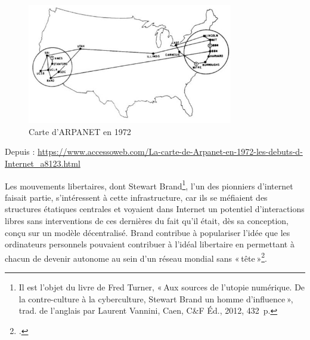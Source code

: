 \begin{figure}[h!]
	\centering
	\includegraphics[width=0.8\textwidth]{images/image24.jpg}
	\caption{Carte d’ARPANET en 1972}
	\label{fig:image24}
\end{figure}

\begin{center}
	Depuis : \url{https://www.accessoweb.com/La-carte-de-Arpanet-en-1972-les-debuts-d-Internet_a8123.html}
\end{center}


Les mouvements libertaires, dont Stewart Brand\footnote{ Il est l’objet du livre de Fred Turner, « Aux sources de l’utopie numérique. De la contre-culture à la cyberculture, Stewart Brand un homme d’influence », trad. de l’anglais par Laurent Vannini, Caen, C\&F Éd., 2012, 432 p.}, l’un des pionniers d’internet faisait partie, s’intéressent à cette infrastructure, car ils se méfiaient des structures étatiques centrales et voyaient dans Internet un potentiel d’interactions libres sans interventions de ces dernières du fait qu'il était, dès sa conception, conçu sur un modèle décentralisé. Brand contribue à populariser l’idée que les ordinateurs personnels pouvaient contribuer à l’idéal libertaire en permettant à chacun de devenir autonome au sein d’un réseau mondial sans « tête »\footcite[§ 5]{goeta_fred_2013}.

